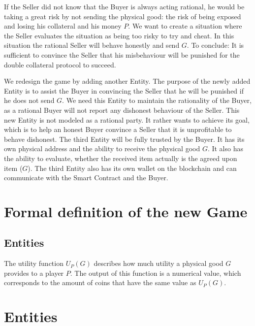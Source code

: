 \documentclass{cacthesis}
\begin{document}
If the Seller did not know that the Buyer is always acting rational, he would be taking a great risk by not sending the physical good: the risk of being exposed and losing his collateral and his money $P$.\newline
We want to create a situation where the Seller evaluates the situation as being too risky to try and cheat. In this situation the rational Seller will behave honestly and  send $G$.\newline
To conclude: It is sufficient to convince the Seller that his misbehaviour will be punished for the double collateral protocol to succeed.

We redesign the game by adding another Entity. The purpose of the newly added Entity is to assist the Buyer in convincing the Seller that he will be punished if he does not send $G$. We need this Entity to maintain the rationality of the Buyer, as a rational Buyer will not report any dishonest behaviour of the Seller.\newline
This new Entity is not modeled as a rational party. It rather wants to achieve its goal, which is to help an honest Buyer convince a Seller that it is unprofitable to behave dishonest.\newline
The third Entity will be fully trusted by the Buyer. It has its own physical address and  the ability to receive the physical good $G$. It also has the ability to evaluate, whether the received item actually is the agreed upon item ($G$).\newline
The third Entity also has its own wallet on the blockchain and can communicate with the Smart Contract and the Buyer.

\section{Formal definition of the new Game}
\subsection{Entities}

The utility function $U_P(G)$ describes how much utility a physical good $G$ provides to a player $P$. The output of this function is a numerical value, which corresponds to the amount of coins that have the same value as $U_P(G)$.
\section{Entities}
\end{document}
